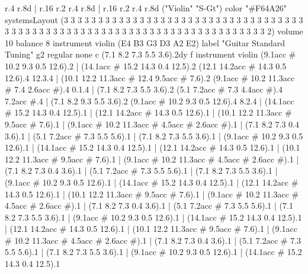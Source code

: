       r.4
      r.8{d}
    |
      r.16
      r.2
      r.4
      r.8{d}
    |
      r.16
      r.2
      r.4
      r.8{d}
\track ("Violin" "S-Gt") {
  color "#F64A26"
  systemsLayout (3 3 3 3 3 3 3 3 3 3 3 3 3 3 3 3 3 3 3 3 3 3 3 3 3 3 3 3 3 3 3 3 3 3 3 3 3 3 3 3 3 3 3 3 3 3 3 3 3 3 3 3 3 3 3 3 3 3 3 3 3 3 3 3 3 3 3 3 3 3 3 3 3 2)
  volume 10
  balance 8
  instrument violin
}
    \tuning (E4 B3 G3 D3 A2 E2) {
      label "Guitar Standard Tuning"
    }
    \clef g2
    \ottava regular
    \simile none
    \ks c
      (7.1 8.2 7.3 5.5 3.6).2{dy f instrument violin}
      (9.1{acc #} 10.2 9.3 0.5 12.6).2
    |
      (14.1{acc #} 15.2 14.3 0.4 12.5).2
      (12.1 14.2{acc #} 14.3 0.5 12.6).4
      12.3.4
    |
      (10.1 12.2 11.3{acc #} 12.4 9.5{acc #} 7.6).2
      (9.1{acc #} 10.2 11.3{acc #} 7.4 2.6{acc #}).4
      0.1.4
    |
      (7.1 8.2 7.3 5.5 3.6).2
      (5.1 7.2{acc #} 7.3 4.4{acc #}).4
      7.2{acc #}.4
    |
      (7.1 8.2 9.3 5.5 3.6).2
      (9.1{acc #} 10.2 9.3 0.5 12.6).4
      8.2.4
    |
      (14.1{acc #} 15.2 14.3 0.4 12.5).1
    |
      (12.1 14.2{acc #} 14.3 0.5 12.6).1
    |
      (10.1 12.2 11.3{acc #} 9.5{acc #} 7.6).1
    |
      (9.1{acc #} 10.2 11.3{acc #} 4.5{acc #} 2.6{acc #}).1
    |
      (7.1 8.2 7.3 0.4 3.6).1
    |
      (5.1 7.2{acc #} 7.3 5.5 5.6).1
    |
      (7.1 8.2 7.3 5.5 3.6).1
    |
      (9.1{acc #} 10.2 9.3 0.5 12.6).1
    |
      (14.1{acc #} 15.2 14.3 0.4 12.5).1
    |
      (12.1 14.2{acc #} 14.3 0.5 12.6).1
    |
      (10.1 12.2 11.3{acc #} 9.5{acc #} 7.6).1
    |
      (9.1{acc #} 10.2 11.3{acc #} 4.5{acc #} 2.6{acc #}).1
    |
      (7.1 8.2 7.3 0.4 3.6).1
    |
      (5.1 7.2{acc #} 7.3 5.5 5.6).1
    |
      (7.1 8.2 7.3 5.5 3.6).1
    |
      (9.1{acc #} 10.2 9.3 0.5 12.6).1
    |
      (14.1{acc #} 15.2 14.3 0.4 12.5).1
    |
      (12.1 14.2{acc #} 14.3 0.5 12.6).1
    |
      (10.1 12.2 11.3{acc #} 9.5{acc #} 7.6).1
    |
      (9.1{acc #} 10.2 11.3{acc #} 4.5{acc #} 2.6{acc #}).1
    |
      (7.1 8.2 7.3 0.4 3.6).1
    |
      (5.1 7.2{acc #} 7.3 5.5 5.6).1
    |
      (7.1 8.2 7.3 5.5 3.6).1
    |
      (9.1{acc #} 10.2 9.3 0.5 12.6).1
    |
      (14.1{acc #} 15.2 14.3 0.4 12.5).1
    |
      (12.1 14.2{acc #} 14.3 0.5 12.6).1
    |
      (10.1 12.2 11.3{acc #} 9.5{acc #} 7.6).1
    |
      (9.1{acc #} 10.2 11.3{acc #} 4.5{acc #} 2.6{acc #}).1
    |
      (7.1 8.2 7.3 0.4 3.6).1
    |
      (5.1 7.2{acc #} 7.3 5.5 5.6).1
    |
      (7.1 8.2 7.3 5.5 3.6).1
    |
      (9.1{acc #} 10.2 9.3 0.5 12.6).1
    |
      (14.1{acc #} 15.2 14.3 0.4 12.5).1
